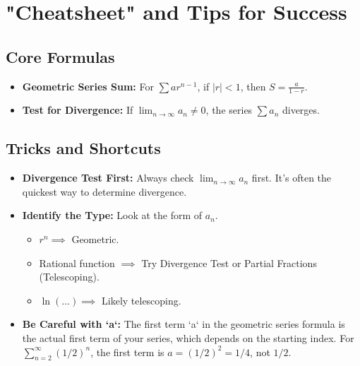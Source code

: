\documentclass{article}
\begin{document}
\section{"Cheatsheet" and Tips for Success}
\subsection{Core Formulas}
\begin{itemize}
    \item \textbf{Geometric Series Sum:} For $\sum ar^{n-1}$, if $|r|<1$, then $S = \frac{a}{1-r}$.
    \item \textbf{Test for Divergence:} If $\lim_{n \to \infty} a_n \neq 0$, the series $\sum a_n$ diverges.
\end{itemize}

\subsection{Tricks and Shortcuts}
\begin{itemize}
    \item \textbf{Divergence Test First:} Always check $\lim_{n \to \infty} a_n$ first. It's often the quickest way to determine divergence.
    \item \textbf{Identify the Type:} Look at the form of $a_n$.
        \begin{itemize}
            \item $r^n \implies$ Geometric.
            \item Rational function $\implies$ Try Divergence Test or Partial Fractions (Telescoping).
            \item $\ln(\dots) \implies$ Likely telescoping.
        \end{itemize}
    \item \textbf{Be Careful with `a`:} The first term `a` in the geometric series formula is the actual first term of your series, which depends on the starting index. For $\sum_{n=2}^{\infty} (1/2)^n$, the first term is $a = (1/2)^2 = 1/4$, not $1/2$.
\end{itemize}
\end{document}
